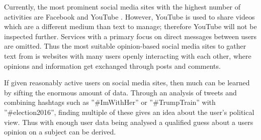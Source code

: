 Currently, the most prominent social media sites with the highest number of
activities are Facebook and YouTube \citep{SocialMediaStats}. However, YouTube
is used to share videos which are a different medium than text to manage;
therefore YouTube will not be inspected further. Services with a primary focus
on direct messages between users are omitted. Thus the most suitable
opinion-based social media sites to gather text from is websites with many users
openly interacting with each other, where opinions and information get exchanged
through posts and comments.\nl

If given reasonably active users on social media sites, then much can be learned
by sifting the enormous amount of data. Through an analysis of tweets and
combining hashtags such as ”\#ImWithHer” or ”\#TrumpTrain” with
”\#election2016”, finding multiple of these gives an idea about the user's
political view. Thus with enough user data being analysed a qualified guess
about a users opinion on a subject can be derived.\nl
